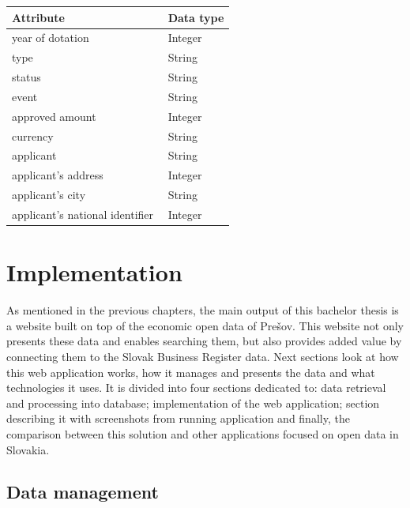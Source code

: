 \documentclass[thesis=B,english]{FITthesis}[2012/06/26]
\begin{document}
    \begin{center}
        \begin{tabular}{  p{0.7\linewidth} | p{0.3\linewidth} }
        Attribute & Data type\\ \hline
        year of dotation & Integer \\
        type & String \\
        status & String \\
        event & String \\
        approved amount & Integer \\
        currency & String \\
        applicant & String \\
        applicant's address & Integer \\
        applicant's city & String \\
        applicant's national identifier & Integer \\
        \end{tabular}
    \end{center} 
	
	\chapter{Implementation}
	\label{implementation}
	As mentioned in the previous chapters, the main output of this bachelor thesis is a website built on top of the economic open data of Prešov. This website not only presents these data and enables searching them, but also provides added value by connecting them to the Slovak Business Register data. Next sections look at how this web application works, how it manages and presents the data and what technologies it uses.   It is divided into four sections dedicated to: data retrieval and processing into database; implementation of the web application; section describing it with screenshots from running application and finally, the comparison between this solution and other applications focused on open data in Slovakia.
	\section{Data management}
\end{document}
